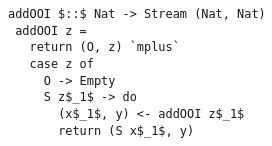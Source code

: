\begin{figure}[!t]
  \centering
  \begin{minipage}{0.85\columnwidth}
    \begin{lstlisting}[frame=tb]
 addOOI $::$ Nat -> Stream (Nat, Nat)
 addOOI z =
   return (O, z) `mplus`
   case z of
     O -> Empty
     S z$_1$ -> do
       (x$_1$, y) <- addOOI z$_1$
       return (S x$_1$, y)
    \end{lstlisting}
  \end{minipage}
\end{figure}